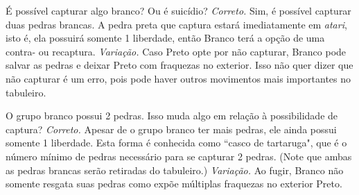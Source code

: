 \problemDiagrams
  {É possível capturar algo branco? Ou é suicídio?}
\answerDiagrams
  {\emph{Correto.} Sim, é possível capturar duas pedras brancas. A pedra preta que captura estará imediatamente em \emph{atari}, isto é, ela possuirá somente 1 liberdade, então Branco terá a opção de uma contra- ou recaptura.}
  {\emph{Variação.} Caso Preto opte por não capturar, Branco pode salvar as pedras e deixar Preto com fraquezas no exterior. Isso não quer dizer que não capturar é um erro, pois pode haver outros movimentos mais importantes no tabuleiro.}

\problemDiagrams
  {O grupo branco possui 2 pedras. Isso muda algo em relação à possibilidade de captura?}
\answerDiagrams
  {\emph{Correto.} Apesar de o grupo branco ter mais pedras, ele ainda possui somente 1 liberdade. Esta forma é conhecida como ``casco de tartaruga", que é o número mínimo de pedras necessário para se capturar 2 pedras. (Note que ambas as pedras brancas serão retiradas do tabuleiro.)}
  {\emph{Variação.} Ao fugir, Branco não somente resgata suas pedras como expõe múltiplas fraquezas no exterior Preto.}
